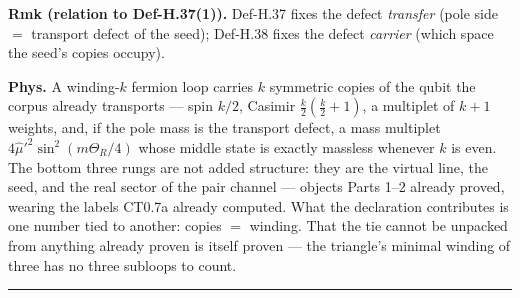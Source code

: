\begin{theorem}
\textbf{Rmk (relation to Def-H.37(1)).} Def-H.37 fixes the defect \textit{transfer} (pole side $=$ transport defect of the seed); Def-H.38 fixes the defect \textit{carrier} (which space the seed's copies occupy).

\textbf{Phys.} A winding-$k$ fermion loop carries $k$ symmetric copies of the qubit the corpus already transports — spin $k/2$, Casimir $\tfrac k2(\tfrac k2+1)$, a multiplet of $k+1$ weights, and, if the pole mass is the transport defect, a mass multiplet $4\hat\mu'^2\sin^2(m\Theta_R/4)$ whose middle state is exactly massless whenever $k$ is even. The bottom three rungs are not added structure: they are the virtual line, the seed, and the real sector of the pair channel — objects Parts 1–2 already proved, wearing the labels CT0.7a already computed. What the declaration contributes is one number tied to another: copies $=$ winding. That the tie cannot be unpacked from anything already proven is itself proven — the triangle's minimal winding of three has no three subloops to count.

\vspace{2pt}\noindent\rule{\textwidth}{0.4pt}\vspace{2pt}

\end{theorem}

